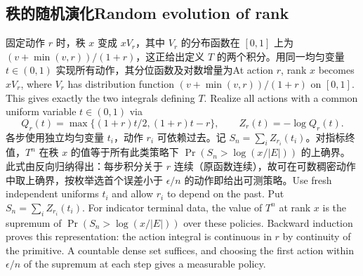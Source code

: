 \documentclass[UTF8,fontset=fandol,11pt]{ctexart}
\newcommand{\bi}[2]{\ifdefined\ResearchPaperChinese #1\else #2\fi}
\begin{document}
\subsection{\bi{秩的随机演化}{Random evolution of rank}}
\bi{固定动作 $r$ 时，秩 $x$ 变成 $xV_r$，其中 $V_r$ 的分布函数在 $[0,1]$ 上为 $(v+\min(v,r))/(1+r)$，这正给出定义 $T$ 的两个积分。用同一均匀变量 $t\in(0,1)$ 实现所有动作，其分位函数及对数增量为}{At action $r$, rank $x$ becomes $xV_r$, where $V_r$ has distribution function $(v+\min(v,r))/(1+r)$ on $[0,1]$. This gives exactly the two integrals defining $T$. Realize all actions with a common uniform variable $t\in(0,1)$ via}
\[
 Q_r(t)=\max\{(1+r)t/2,(1+r)t-r\},\qquad Z_r(t)=-\log Q_r(t).
\]
\bi{各步使用独立均匀变量 $t_i$，动作 $r_i$ 可依赖过去。记 $S_n=\sum_i Z_{r_i}(t_i)$。对指标终值，$T^n$ 在秩 $x$ 的值等于所有此类策略下 $\Pr(S_n>\log(x/|E|))$ 的上确界。此式由反向归纳得出：每步积分关于 $r$ 连续（原函数连续），故可在可数稠密动作中取上确界，按枚举选首个误差小于 $\epsilon/n$ 的动作即给出可测策略。}{Use fresh independent uniforms $t_i$ and allow $r_i$ to depend on the past. Put $S_n=\sum_i Z_{r_i}(t_i)$. For indicator terminal data, the value of $T^n$ at rank $x$ is the supremum of $\Pr(S_n>\log(x/|E|))$ over these policies. Backward induction proves this representation: the action integral is continuous in $r$ by continuity of the primitive. A countable dense set suffices, and choosing the first action within $\epsilon/n$ of the supremum at each step gives a measurable policy.}
\end{document}
